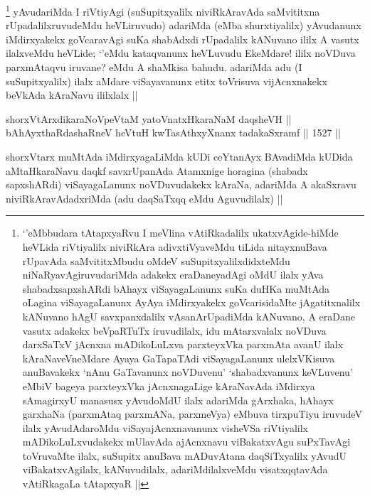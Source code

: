 \begin{artha}
\footnote{`\stext'eMbbudara tAtapxyaRvu I meVlina vAtiRkadalilx ukatxvAgide-hiMde heVLida riVtiyalilx niviRkAra adivxtiVyaveMdu tiLida nitayxnuBava rUpavAda saMvititxMbudu oMdeV suSupitxyalilxdidxteMdu niNaRyavAgiruvudariMda adakekx eraDaneyadAgi oMdU ilalx yAva shabadxsapxshARdi bAhayx viSayagaLanunx suKa duHKa muMtAda oLagina viSayagaLanunx AyAya iMdirxyakekx goVcarisidaMte jAgatitxnalilx kANuvano hAgU savxpanxdalilx vAsanArUpadiMda kANuvano, A eraDane vasutx adakekx beVpaRTuTx iruvudilalx, idu mAtarxvalalx noVDuva darxSaTxV jAcnxna mADikoLuLxva parxteyxVka parxmAta avanU ilalx kAraNaveVneMdare Ayaya GaTapaTAdi viSayagaLanunx ulelxVKisuva anuBavakekx `nAnu GaTavanunx noVDuvenu' `shabadxvanunx keVLuvenu' eMbiV bageya parxteyxVka jAcnxnagaLige kAraNavAda iMdirxya sAmagirxyU manasusx yAvudoMdU ilalx adariMda gArxhaka, hAhayx garxhaNa (parxmAtaq parxmANa, parxmeVya) eMbuva tirxpuTiyu iruvudeV ilalx yAvudAdaroMdu viSayajAcnxnavanunx visheVSa riVtiyalilx mADikoLuLxvudakekx mUlavAda ajAcnxnavu viBakatxvAgu suPxTavAgi toVruvaMte ilalx, suSupitx anuBava mADuvAtana daqSiTxyalilx yAvudU viBakatxvAgilalx, kANuvudilalx, adariMdilalxveMdu visatxqqtavAda vAtiRkagaLa tAtapxyaR ||}
yAvudariMda I riVtiyAgi (suSupitxyalilx niviRkAravAda saMvititxna rUpadalilxruvudeMdu heVLiruvudo) adariMda (\stext eMba shurxtiyalilx) yAvudanunx iMdirxyakekx goVcaravAgi suKa shabAdxdi rUpadalilx kANuvano ililx A vasutx ilalxveMdu heVLide; `\stext'eMdu kataqvanunx heVLuvudu EkeMdare! ililx noVDuva parxmAtaqvu iruvane? eMdu A shaMkisa bahudu. adariMda adu (I suSupitxyalilx) ilalx aMdare viSayavanunx etitx toVrisuva vijAcnxnakekx beVkAda kAraNavu ililxlalx ||
\end{artha}



\begin{shl}
shorxVtArxdikaraNoVpeVtaM yatoV\s natxHkaraNaM daqsheVH || \\
bAhAyxthaRdashaRneV heVtuH kwTasAthxyXnanx tadakaSxramf ||  1527 ||  
\end{shl}

\begin{artha}
shorxVtarx muMtAda iMdirxyagaLiMda kUDi ceYtanAyx BAvadiMda kUDida aMtaHkaraNavu daqkf savxrUpanAda Atamxnige horagina (shabadx sapxshARdi) viSayagaLanunx noVDuvudakekx kAraNa, adariMda A akaSxravu niviRkAravAdadxriMda (adu daqSaTxqq eMdu Aguvudilalx) ||
\end{artha}

